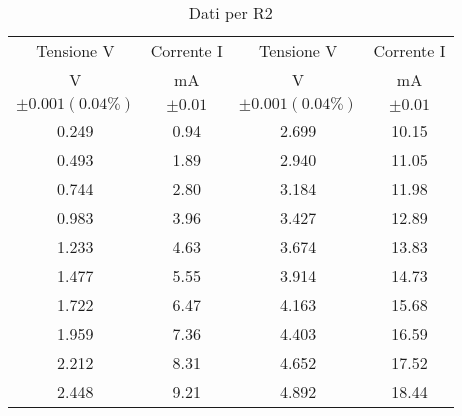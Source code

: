 \begin{table}[H]
    \centering
    \begin{tabular}{|c|c||c|c|}
    \hline
        Tensione V 	&	Corrente I & Tensione V   &   Corrente I 	\\
        V	&	mA      & V &   mA	\\
        $\pm 0.001 (0.04\%)$	&	$\pm 0.01 $ & $\pm 0.001 (0.04\%)$   &   $\pm 0.01 $	\\ \hline
        0.249   &   0.94    &   2.699   &   10.15   \\
        0.493   &   1.89    &   2.940   &   11.05   \\
        0.744   &   2.80    &   3.184   &   11.98   \\
        0.983   &   3.96    &   3.427   &   12.89   \\
        1.233   &   4.63    &   3.674   &   13.83   \\
        1.477   &   5.55    &   3.914   &   14.73   \\
        1.722   &   6.47    &   4.163   &   15.68   \\
        1.959   &   7.36    &   4.403   &   16.59   \\
        2.212   &   8.31    &   4.652   &   17.52   \\
        2.448   &   9.21    &   4.892   &   18.44   \\ \hline
    \end{tabular}
    \caption{Dati per R2}
    \label{tab:R2_ohm}
\end{table}




       
        
        